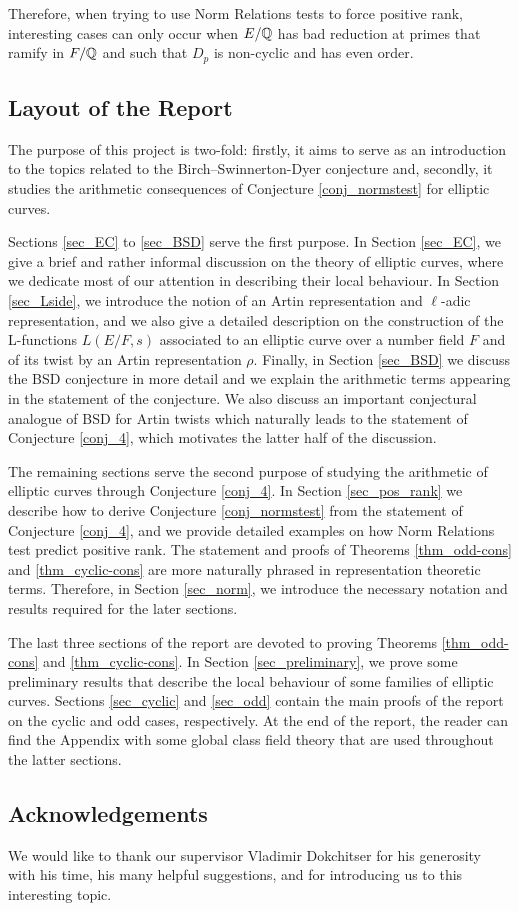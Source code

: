 Therefore, when trying to use Norm Relations tests to force positive rank, interesting cases can only occur when $E/\mathbb{Q}$ has bad reduction at primes that ramify in $F/\mathbb{Q}$ and such that $D_p$ is non-cyclic and has even order.

\subsection*{Layout of the Report}
The purpose of this project is two-fold: firstly, it aims to serve as an introduction to the topics related to the Birch--Swinnerton-Dyer conjecture and, secondly, it studies the arithmetic consequences of Conjecture \ref{conj_normstest} for elliptic curves.

Sections \ref{sec_EC} to \ref{sec_BSD} serve the first purpose. In Section \ref{sec_EC}, we give a brief and rather informal discussion on the theory of elliptic curves, where we dedicate most of our attention in describing their local behaviour. 
In Section \ref{sec_Lside}, we introduce the notion of an Artin representation and $\ell$-adic representation, and we also give a detailed description on the construction of the L-functions $L(E/F,s)$ associated to an elliptic curve over a number field $F$ and of its twist by an Artin representation $\rho$. Finally, in Section \ref{sec_BSD} we discuss the BSD conjecture in more detail and we explain the arithmetic terms appearing in the statement of the conjecture. We also discuss an important conjectural analogue of BSD for Artin twists which naturally leads to the statement of Conjecture \ref{conj_4}, which motivates the latter half of the discussion.

The remaining sections serve the second purpose of studying the arithmetic of elliptic curves through Conjecture \ref{conj_4}. In Section \ref{sec_pos_rank} we describe how to derive Conjecture \ref{conj_normstest} from the statement of Conjecture \ref{conj_4}, and we provide detailed examples on how Norm Relations test predict positive rank. The statement and proofs of Theorems \ref{thm_odd-cons} and \ref{thm_cyclic-cons} are more naturally phrased in representation theoretic terms. Therefore, in Section \ref{sec_norm}, we introduce the necessary notation and results required for the later sections. 

The last three sections of the report are devoted to proving Theorems \ref{thm_odd-cons} and \ref{thm_cyclic-cons}. In Section \ref{sec_preliminary}, we prove some preliminary results that describe the local behaviour of some families of elliptic curves. Sections \ref{sec_cyclic} and \ref{sec_odd} contain the main proofs of the report on the cyclic and odd cases, respectively. At the end of the report, the reader can find the Appendix with some global class field theory that are used throughout the latter sections.

\subsection*{Acknowledgements}

We would like to thank our supervisor Vladimir Dokchitser for his generosity with his time, his many helpful suggestions, and for introducing us to this interesting topic.
